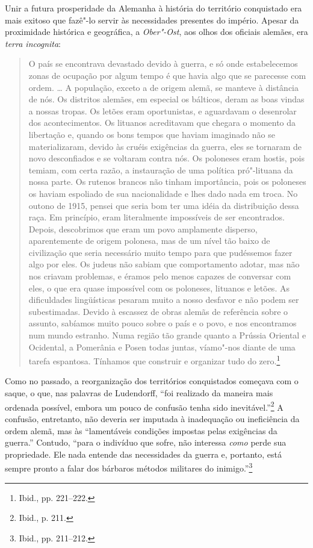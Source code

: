 Unir a futura prosperidade da Alemanha à história do território
conquistado era mais exitoso que fazê"-lo servir às necessidades
presentes do império. Apesar da proximidade histórica e geográfica, a
\emph{Ober"-Ost}, aos olhos dos oficiais alemães, era \emph{terra
incognita}:

\begin{quote}
O país se encontrava devastado devido à guerra, e só onde estabelecemos
zonas de ocupação por algum tempo é que havia algo que se parecesse com
ordem. \ldots{} A população, exceto a de origem alemã, se manteve à
distância de nós. Os distritos alemães, em especial os bálticos, deram
as boas vindas a nossas tropas. Os letões eram oportunistas, e
aguardavam o desenrolar dos acontecimentos. Os lituanos acreditavam que
chegara o momento da libertação e, quando os bons tempos que haviam
imaginado não se materializaram, devido às cruéis exigências da guerra,
eles se tornaram de novo desconfiados e se voltaram contra nós. Os
poloneses eram hostis, pois temiam, com certa razão, a instauração de
uma política pró"-lituana da nossa parte. Os rutenos brancos não tinham
importância, pois os poloneses os haviam espoliado de sua nacionalidade
e lhes dado nada em troca. No outono de 1915, pensei que seria bom ter
uma idéia da distribuição dessa raça. Em princípio, eram literalmente
impossíveis de ser encontrados. Depois, descobrimos que eram um povo
amplamente disperso, aparentemente de origem polonesa, mas de um nível
tão baixo de civilização que seria necessário muito tempo para que
pudéssemos fazer algo por eles. Os judeus não sabiam que comportamento
adotar, mas não nos criavam problemas, e éramos pelo menos capazes de
conversar com eles, o que era quase impossível com os poloneses,
lituanos e letões. As dificuldades lingüísticas pesaram muito a nosso
desfavor e não podem ser subestimadas. Devido à escassez de obras alemãs
de referência sobre o assunto, sabíamos muito pouco sobre o país e o
povo, e nos encontramos num mundo estranho. Numa região tão grande
quanto a Prússia Oriental e Ocidental, a Pomerânia e Posen todas juntas,
víamo"-nos diante de uma tarefa espantosa. Tínhamos que construir e
organizar tudo do zero.\footnote{Ibid., pp. 221--222.}
\end{quote}

%

Como no passado, a reorganização dos territórios conquistados começava
com o saque, o que, nas palavras de Ludendorff, ``foi realizado da
maneira mais ordenada possível, embora um pouco de confusão tenha sido
inevitável.''\footnote{Ibid., p. 211.} A confusão, entretanto, não
deveria ser imputada à inadequação ou ineficiência da ordem alemã, mas
às ``lamentáveis condições impostas pelas exigências da guerra.''
Contudo, ``para o indivíduo que sofre, não interessa \emph{como} perde
sua propriedade. Ele nada entende das necessidades da guerra e,
portanto, está sempre pronto a falar dos bárbaros métodos militares do
inimigo.''\footnote{Ibid., pp. 211--212.}

